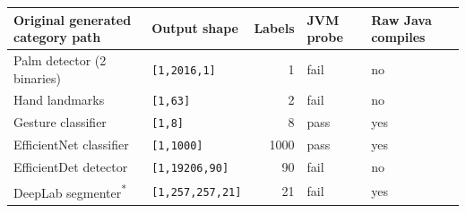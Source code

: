 \begin{tabular}{@{}llrll@{}}
\toprule
Original generated category path & Output shape & Labels & JVM probe & Raw Java compiles\\
\midrule
Palm detector (2 binaries) & \texttt{[1,2016,1]} & 1 & fail & no \\
Hand landmarks & \texttt{[1,63]} & 2 & fail & no \\
Gesture classifier & \texttt{[1,8]} & 8 & pass & yes \\
EfficientNet classifier & \texttt{[1,1000]} & 1000 & pass & yes \\
EfficientDet detector & \texttt{[1,19206,90]} & 90 & fail & no \\
DeepLab segmenter\textsuperscript{*} & \texttt{[1,257,257,21]} & 21 & fail & yes \\
\bottomrule
\end{tabular}
